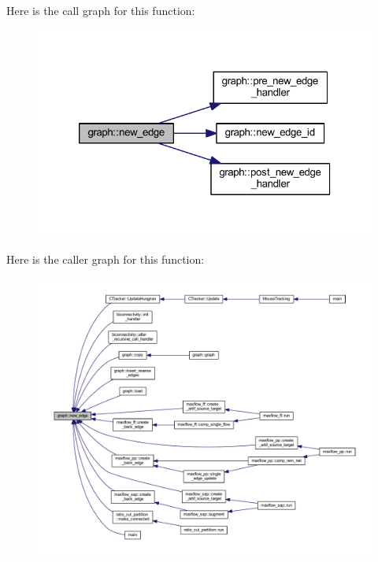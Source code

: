 Here is the call graph for this function\+:
\nopagebreak
\begin{figure}[H]
\begin{center}
\leavevmode
\includegraphics[width=320pt]{classgraph_a02a0c3a219f75d68caa408ef339d4a1c_cgraph}
\end{center}
\end{figure}
Here is the caller graph for this function\+:
\nopagebreak
\begin{figure}[H]
\begin{center}
\leavevmode
\includegraphics[width=350pt]{classgraph_a02a0c3a219f75d68caa408ef339d4a1c_icgraph}
\end{center}
\end{figure}
\mbox{\label{classgraph_a2ae550efa58c48056d5df22ed26c5c6c}} 
